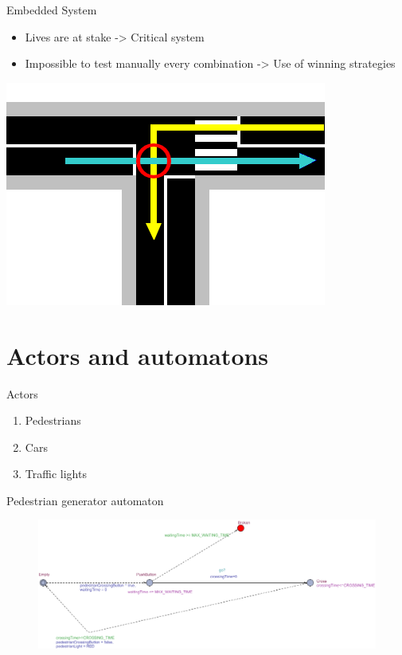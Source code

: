 \documentclass{bredelebeamer}
\begin{document}




\begin{frame}{Embedded System}
 \begin{itemize}
\item Lives are at stake -> Critical system
\item Impossible to test manually every combination -> Use of winning strategies
\end{itemize}
\centering
\includegraphics[scale=0.4]{images/exempleCollision.png}
\end{frame}

\section{Actors and automatons}
\begin{frame}{Actors}
\begin{enumerate}
\item <1-> Pedestrians
\item <2-> Cars
\item <3-> Traffic lights
\end{enumerate}
\end{frame}

\begin{frame}{Pedestrian generator automaton}
\begin{figure}[h]
\centering
\includegraphics[width=\textwidth]{images/pedestrian.png}
\end{figure}
\end{frame}
\end{document}

